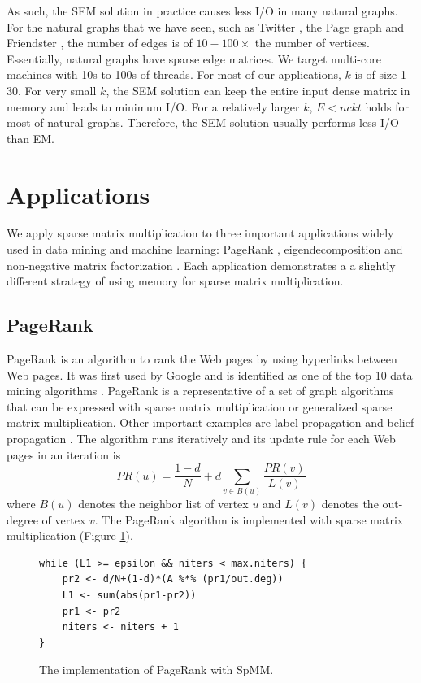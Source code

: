As such, the SEM solution in practice causes less I/O in many natural graphs.
For the natural graphs that we have seen, such as Twitter \cite{twitter},
the Page graph \cite{web_graph} and Friendster \cite{friendster}, the number
of edges is of $10-100 \times$ the number of vertices. Essentially,
natural graphs have sparse edge matrices. We target multi-core machines with
10s to 100s of threads. For most of our applications, $k$ is of size 1-30.
For very small $k$, the SEM
solution can keep the entire input dense matrix in memory and leads to minimum
I/O. For a relatively larger $k$, $E < n c k t$ holds
for most of natural graphs. Therefore, the SEM solution usually performs less
I/O than EM.

\section{Applications} \label{sec:apps}
We apply sparse matrix multiplication to three important applications widely
used in data mining and machine learning: PageRank \cite{pagerank},
eigendecomposition \cite{anasazi} and non-negative matrix factorization \cite{nmf}.
Each application demonstrates a a slightly different strategy of using memory
for sparse matrix multiplication.

\subsection{PageRank} \label{sec:pagerank}
PageRank is an algorithm to rank the Web pages by using hyperlinks between Web
pages. It was first used by Google and is identified as one of the top 10 data
mining algorithms \cite{top10}. PageRank is a representative of a set of graph
algorithms that can be expressed with sparse matrix multiplication or generalized
sparse matrix multiplication. Other important examples are label propagation
\cite{label_prop} and belief propagation \cite{Yedidia03}. The algorithm runs
iteratively and its update rule for each Web pages in an iteration is
\begin{equation*}
PR(u) = \frac{1-d}{N} + d \sum\limits_{v \in B(u)} \frac{PR(v)}{L(v)}
\end{equation*}
where $B(u)$ denotes the neighbor list of vertex $u$ and $L(v)$ denotes
the out-degree of vertex $v$. The PageRank algorithm is implemented with sparse
matrix multiplication (Figure \ref{code:pagerank}).


\begin{figure}
\centering
\begin{lstlisting}
while (L1 >= epsilon && niters < max.niters) {
	pr2 <- d/N+(1-d)*(A %*% (pr1/out.deg))
	L1 <- sum(abs(pr1-pr2))
	pr1 <- pr2
	niters <- niters + 1
}
\end{lstlisting}
\caption{The implementation of PageRank with SpMM.}
\label{code:pagerank}
\end{figure}

